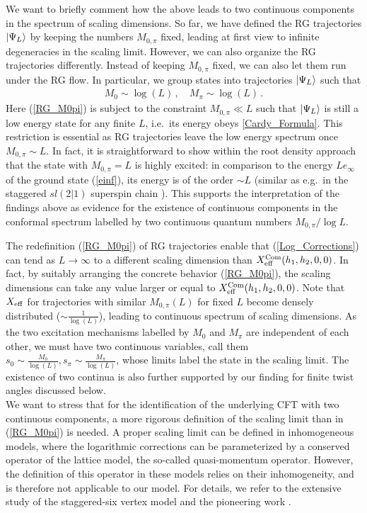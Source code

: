 \documentclass[12pt]{article}
\numberwithin{equation}{section}
\begin{document}
	We want to briefly comment how the above leads to two continuous components in the spectrum of scaling dimensions. So far, we have defined the RG trajectories $\ket{\Psi_L}$ by keeping the numbers $M_{0,\pi}$ fixed, leading at first view to infinite degeneracies in the scaling limit. 
	However, we can also organize the RG trajectories differently. Instead of keeping $M_{0,\pi}$ fixed, we can also let them run under the RG flow. In particular, we group states into trajectories $\ket{\Psi_L}$ such that 
	\begin{align}
		M_{0}\sim \log(L)\,, \quad M_{\pi}\sim \log(L) \label{RG_M0pi}\,.
	\end{align}
	Here (\ref{RG_M0pi}) is subject to the constraint $M_{0,\pi}\ll L$ such that $\ket{\Psi_L}$ is still a low energy state for any finite $L$, i.e.\ its energy obeys  \eqref{Cardy_Formula}. This restriction is essential as RG trajectories leave the low energy spectrum once $M_{0,\pi}\sim L$.  In fact, it is straightforward to show within the root density approach that the state with $M_{0,\pi}=L$ is highly excited: in comparison to the energy $L e_\infty$ of the ground state (\ref{einf}), its energy is of the order $\sim L$ (similar as e.g.\ in the staggered $sl(2|1)$ superspin chain \cite{EsFS05}).  This supports the interpretation of the findings above as evidence for the existence of continuous components in the conformal spectrum labelled by two continuous quantum numbers $M_{0,\pi}/\log L$. 
	
	The redefinition (\ref{RG_M0pi}) of RG trajectories enable that (\ref{Log_Corrections}) can tend as $L\to \infty$ to a different scaling dimension than $X^{\rm{Com}}_{\rm{eff}}(h_1,h_2,0,0)$. In fact, by suitably arranging the concrete behavior (\ref{RG_M0pi}), the scaling dimensions can take any value larger or equal to $X^{\rm{Com}}_{\rm{eff}}(h_1,h_2,0,0)$. Note that $X_{\rm{eff}}$ for trajectories with similar $M_{0,\pi}(L)$ for fixed $L$ become densely distributed ($\sim \frac{1}{\log (L)}$), leading to continuous spectrum of scaling dimensions. As the two excitation mechanisms labelled by $M_{0}$ and $M_{\pi}$ are independent of each other, we must have two continuous variables, call them $s_0\sim \frac{M_0}{\log(L)} ,s_\pi\sim\frac{M_\pi}{\log(L)}$, whose limits label the state in the scaling limit. The existence of two continua is also further supported by our finding for finite twist angles discussed below.\\
	
	We want to stress that for the identification of the underlying CFT with two continuous components, a more rigorous definition of the scaling limit than in (\ref{RG_M0pi}) is needed. A proper scaling limit can be defined in inhomogeneous models, where the logarithmic corrections can be parameterized by a conserved operator of the lattice model, the so-called quasi-momentum operator. However, the definition of this operator in these models relies on their inhomogeneity, and is therefore not applicable to our model. For details, we refer to the extensive study of the staggered-six vertex model \cite{BKKL21a,BKKL21b} and the pioneering work  \cite{IkJS12}.
	
\end{document}
